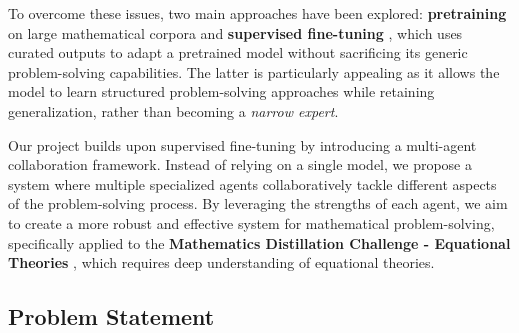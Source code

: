 \documentclass{article}
\begin{document}
To overcome these issues, two main approaches have been explored: \textbf{pretraining} on large mathematical corpora and \textbf{supervised fine-tuning} \cite{stiennon2020learning, instructgpt2022}, which uses curated outputs to adapt a pretrained model without sacrificing its generic problem-solving capabilities. The latter is particularly appealing as it allows the model to learn structured problem-solving approaches while retaining generalization, rather than becoming a \textit{narrow expert}.

Our project builds upon supervised fine-tuning by introducing a multi-agent collaboration framework. Instead of relying on a single model, we propose a system where multiple specialized agents collaboratively tackle different aspects of the problem-solving process. By leveraging the strengths of each agent, we aim to create a more robust and effective system for mathematical problem-solving, specifically applied to the \textbf{Mathematics Distillation Challenge - Equational Theories} \cite{sair2026competition}, which requires deep understanding of equational theories.

\subsection{Problem Statement}


\end{document}
